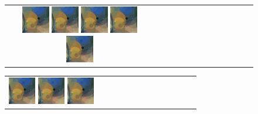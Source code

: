 \documentclass[3p,times,procedia]{elsarticle}
\begin{document}
\begin{figure}[H]
\begin{tabular}{c c c c c c c c c c c c c}
          \includegraphics[width=12mm]{figures/mul/cafe_terrace_at_nightpass7_best.png}
            
          \includegraphics[width=12mm]{figures/mul/cafe_terrace_at_nightpass8_best.png}
          
          \includegraphics[width=12mm]{figures/mul/cafe_terrace_at_nightpass9_best.png}
          
          \includegraphics[width=12mm]{figures/mul/cafe_terrace_at_nightpass10_best.png}
          
          \includegraphics[width=12mm]{figures/mul/cafe_terrace_at_nightpass11_best.png}
          \\
    \end{tabular}
    \begin{tabular}{c c c c c c c c c c c c c}
        \includegraphics[width=12mm]{figures/mul/cafe_terrace_at_nightpass12_best.png}
        
        \includegraphics[width=12mm]{figures/mul/cafe_terrace_at_nightpass13_best.png}
        
        \includegraphics[width=12mm]{figures/mul/cafe_terrace_at_nightpass14_best.png}
        

\end{tabular}
\end{figure}
\end{document}

